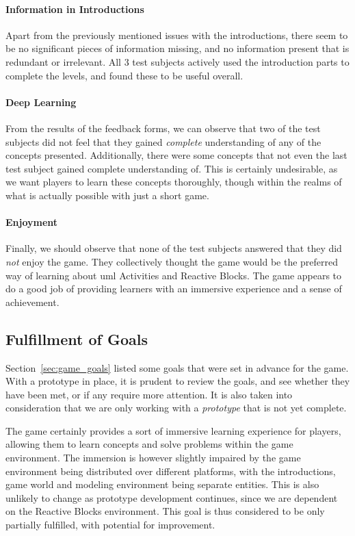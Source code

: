 \paragraph{Information in Introductions} Apart from the previously mentioned issues with the introductions, there seem to be no significant pieces of information missing, and no information present that is redundant or irrelevant. All 3 test subjects actively used the introduction parts to complete the levels, and found these to be useful overall.

\paragraph{Deep Learning} From the results of the feedback forms, we can observe that two of the test subjects did not feel that they gained \emph{complete} understanding of any of the concepts presented. Additionally, there were some concepts that not even the last test subject gained complete understanding of. This is certainly undesirable, as we want players to learn these concepts thoroughly, though within the realms of what is actually possible with just a short game.

\paragraph{Enjoyment} Finally, we should observe that none of the test subjects answered that they did \emph{not} enjoy the game. They collectively thought the game would be the preferred way of learning about \gls{uml} Activities and Reactive Blocks. The game appears to do a good job of providing learners with an immersive experience and a sense of achievement.

\subsection{Fulfillment of Goals}
\label{sec:game_goal_fulfillment}
Section~\ref{sec:game_goals} listed some goals that were set in advance for the game. With a prototype in place, it is prudent to review the goals, and see whether they have been met, or if any require more attention. It is also taken into consideration that we are only working with a \emph{prototype} that is not yet complete.

\noindent
The game certainly provides a sort of immersive learning experience for players, allowing them to learn concepts and solve problems within the game environment. The immersion is however slightly impaired by the game environment being distributed over different platforms, with the introductions, game world and modeling environment being separate entities. This is also unlikely to change as prototype development continues, since we are dependent on the Reactive Blocks environment. This goal is thus considered to be only partially fulfilled, with potential for improvement.

